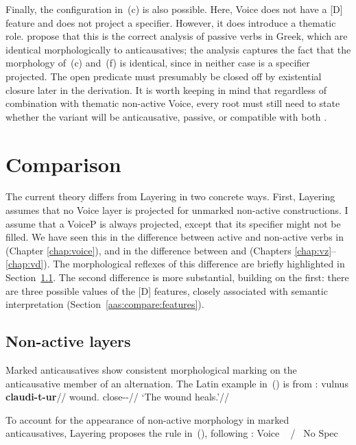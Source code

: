 Finally, the configuration in~(\lastx c) is also possible. Here, Voice does not have a [D] feature and does not project a specifier. However, it does introduce a thematic role. \cite{layering15} propose that this is the correct analysis of passive verbs in Greek, which are identical morphologically to anticausatives; the analysis captures the fact that the morphology of~(\lastx c) and~(\lastx f) is identical, since in neither case is a specifier projected. The open predicate must presumably be closed off by existential closure later in the derivation. It is worth keeping in mind that regardless of combination with thematic non-active Voice, every root must still need to state whether the  variant will be anticausative, passive, or compatible with both \citep[88]{alexiadouanagnostopoulou04,layering15}.


\section{Comparison} \label{aas:compare}
The current theory differs from Layering in two concrete ways. First, Layering assumes that no Voice layer is projected for unmarked non-active constructions. I assume that a VoiceP is always projected, except that its specifier might not be filled. We have seen this in the difference between active and non-active verbs in {\tkal} (Chapter \ref{chap:voice}), and in the difference between {\vz} and {\vd} (Chapters \ref{chap:vz}--\ref{chap:vd}). The morphological reflexes of this difference are briefly highlighted in Section~\ref{aas:compare:vi-nact}. The second difference  is more substantial, building on the first: there are three possible values of the [D] features, closely associated with semantic interpretation (Section~\ref{aas:compare:features}).

	\subsection{Non-active layers} \label{aas:compare:vi-nact}
Marked anticausatives show consistent morphological marking on the anticausative member of an alternation. The Latin example in~(\nextx) is from \citet[662]{kastnerzu17}:
\ex \begingl
	\gla vulnus \textbf{claudi-t-ur}//
	\glb wound. close--//
	\glft `The wound heals.'//
	\endgl
\xe

To account for the appearance of non-active morphology in marked anticausatives, Layering proposes the rule in~(\nextx), following \cite{embick04}:
\ex\label{ex:aas:vi-nact}Voice \lra~ / \trace~No Spec
\xe

